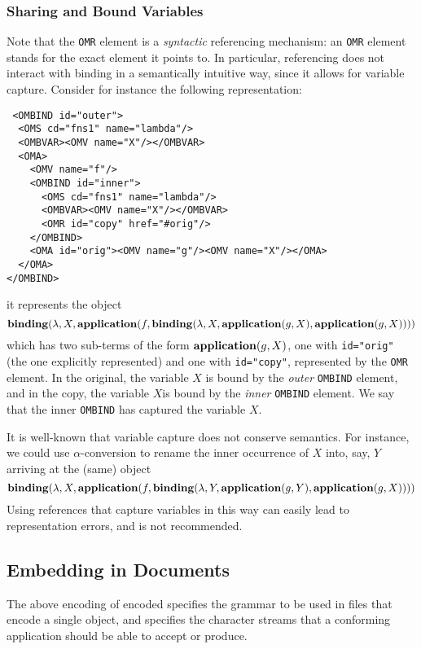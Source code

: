 \subsubsection{Sharing and Bound Variables}\label{sec_sharing_bvars}

Note that the \lstinline|OMR| element is a \emph{syntactic} referencing mechanism: an
\lstinline|OMR| element stands for the exact \XML element it points to. In particular,
referencing does not interact with binding in a semantically intuitive way, since it
allows for variable capture. Consider for instance the following \XML representation:
\begin{lstlisting}
 <OMBIND id="outer">
  <OMS cd="fns1" name="lambda"/>
  <OMBVAR><OMV name="X"/></OMBVAR>
  <OMA>
    <OMV name="f"/>
    <OMBIND id="inner">
      <OMS cd="fns1" name="lambda"/>
      <OMBVAR><OMV name="X"/></OMBVAR>
      <OMR id="copy" href="#orig"/>
    </OMBIND>
    <OMA id="orig"><OMV name="g"/><OMV name="X"/></OMA>
  </OMA>
</OMBIND>
\end{lstlisting}
it represents the \OM object
\[\mathbf{binding}(\lambda,X,\mathbf{application}(f,\mathbf{binding}(\lambda,X,\mathbf{application}(g,X),\mathbf{application}(g,X))))\]
which has two sub-terms of the form $\mathbf{application}(g,X)$, one with \lstinline|id="orig"|
(the one explicitly represented) and one with \lstinline|id="copy"|, represented by the
\lstinline|OMR| element. In the original, the variable $X$ is bound by the \emph{outer}
\lstinline|OMBIND| element, and in the copy, the variable $X$is bound by the \emph{inner}
\lstinline|OMBIND| element. We say that the inner \lstinline|OMBIND| has captured the
variable $X$.

It is well-known that variable capture does not conserve semantics. For instance, we could
use $\alpha$-conversion to rename the inner occurrence of $X$ into, say, $Y$ arriving at
the (same) object
\[\mathbf{binding}(\lambda,X,\mathbf{application}(f,\mathbf{binding}(\lambda,Y,\mathbf{application}(g,Y),\mathbf{application}(g,X))))\]
Using references that capture variables in this way can easily lead to representation
errors, and is not recommended.

\subsection{Embedding \OM in \XML Documents}\label{xmldoc}
     
The above encoding of \XML encoded \OM specifies the grammar to be used in files that
encode a single \OM object, and specifies the character streams that a conforming \OM
application should be able to accept or produce.


